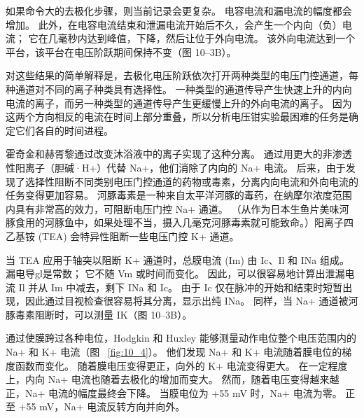 如果命令大的去极化步骤，则当前记录会更复杂。
电容电流和漏电流的幅度都会增加。
此外，在电容电流结束和泄漏电流开始后不久，会产生一个内向（负）电流；
它在几毫秒内达到峰值，下降，然后让位于外向电流。
该外向电流达到一个平台，该平台在电压阶跃期间保持不变（图 10–3B）。


对这些结果的简单解释是，去极化电压阶跃依次打开两种类型的电压门控通道，每种通道对不同的离子种类具有选择性。
一种类型的通道传导产生快速上升的内向电流的离子，而另一种类型的通道传导产生更缓慢上升的外向电流的离子。
因为这两个方向相反的电流在时间上部分重叠，所以分析电压钳实验最困难的任务是确定它们各自的时间进程。


霍奇金和赫胥黎通过改变沐浴液中的离子实现了这种分离。
通过用更大的非渗透性阳离子（胆碱·H+）代替 Na+，他们消除了内向的 Na+ 电流。
后来，由于发现了选择性阻断不同类别电压门控通道的药物或毒素，分离内向电流和外向电流的任务变得更加容易。
河豚毒素是一种来自太平洋河豚的毒药，在纳摩尔浓度范围内具有非常高的效力，可阻断电压门控 Na+ 通道。
（从作为日本生鱼片美味河豚食用的河豚鱼中，如果处理不当，摄入几毫克河豚毒素就可能致命。）阳离子四乙基铵 (TEA) 会特异性阻断一些电压门控 K+ 通道。


当 TEA 应用于轴突以阻断 K+ 通道时，总膜电流 (Im) 由 Ic、Il 和 INa 组成。
漏电导gl是常数； 它不随 Vm 或时间而变化。
因此，可以很容易地计算出泄漏电流 Il 并从 Im 中减去，剩下 INa 和 Ic。
由于 Ic 仅在脉冲的开始和结束时短暂出现，因此通过目视检查很容易将其分离，显示出纯 INa。
同样，当 Na+ 通道被河豚毒素阻断时，可以测量 IK（图 10–3B）。


通过使膜跨过各种电位，Hodgkin 和 Huxley 能够测量动作电位整个电压范围内的 Na+ 和 K+ 电流（图 ~\ref{fig:10_4}）。
他们发现 Na+ 和 K+ 电流随着膜电位的梯度函数而变化。
随着膜电压变得更正，向外的 K+ 电流变得更大。
在一定程度上，内向 Na+ 电流也随着去极化的增加而变大。
然而，随着电压变得越来越正，Na+ 电流的幅度最终会下降。
当膜电位为 +55 mV 时，Na+ 电流为零。
正至 +55 mV，Na+ 电流反转方向并向外。


